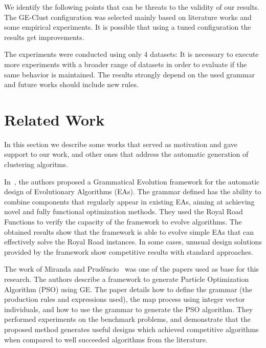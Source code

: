 \documentclass[conference]{IEEEtran}
\begin{document}
	
	We identify the following points that can be threats to the validity of our results. The GE-Clust configuration was selected mainly based on literature works and some empirical experiments. It is possible that using a tuned configuration the results get improvements.
	
	The experiments were conducted using only 4 datasets: It is necessary to execute more experiments with a broader range of datasets in order to evaluate if the same behavior is maintained. The results strongly depend on the used grammar and future works should include new rules.
	
	
	
	\section{Related Work} \label{sec:related_work}
	
	In this section we describe some works that served as motivation and gave support to our work, and other ones that address the automatic generation of clustering algoritms.  
	
	
	In~\cite{lourencco2012evolving,lourencco2015IEEE}, the authors proposed a Grammatical Evolution framework for the automatic design of Evolutionary Algorithms (EAs). The grammar defined has the ability to combine components that regularly appear in existing EAs, aiming at achieving novel and fully functional optimization methods. They used the Royal Road Functions to verify the capacity of the framework to evolve algorithms. The obtained results show that the framework is able to evolve simple EAs that can effectively solve the Royal Road instances. In some cases, unusual design solutions provided by the framework show competitive results with standard approaches.
	
	The work of Miranda and Prudêncio~\cite{miranda2015gefpso} was one of the papers used as base for this research. The authors describe a framework to generate Particle Optimization Algorithm (PSO) using GE. The paper details how to define the grammar (the production rules and expressions used), the map process using integer vector individuals, and how to use the grammar to generate the PSO algorithm. They performed experiments on the benchmark problems, and demonstrate that the proposed method generates useful designs which achieved competitive algorithms when compared to well succeeded algorithms from the literature.
	
\end{document}
